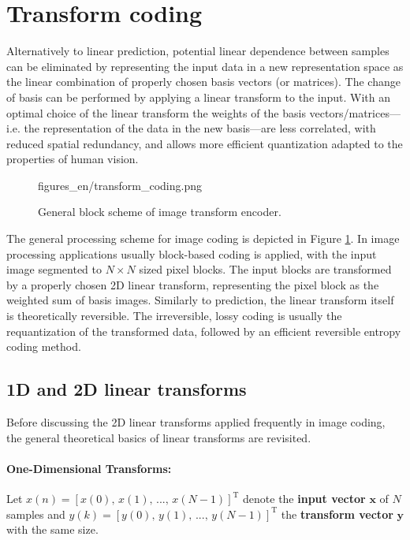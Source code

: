 \section{Transform coding}
Alternatively to linear prediction, potential linear dependence between samples can be eliminated by representing the input data in a new representation space as the linear combination of properly chosen basis vectors (or matrices).
The change of basis can be performed by applying a linear transform to the input.
With an optimal choice of the linear transform the weights of the basis vectors/matrices---i.e. the representation of the data in the new basis---are less correlated, with reduced spatial redundancy, and allows more efficient quantization adapted to the properties of human vision.

\begin{figure}[h!]
	\centering
	\begin{overpic}[width = 0.8\columnwidth ]{figures_en/transform_coding.png}
	\end{overpic}
	\caption{General block scheme of image transform encoder.}
	\label{Fig:transform_coding}
\end{figure}
The general processing scheme for image coding is depicted in Figure \ref{Fig:transform_coding}.
In image processing applications usually block-based coding is applied, with the input image segmented to $N\times N$ sized pixel blocks.
The input blocks are transformed by a properly chosen 2D linear transform, representing the pixel block as the weighted sum of basis images.
Similarly to prediction, the linear transform itself is theoretically reversible.
The irreversible, lossy coding is usually the requantization of the transformed data, followed by an efficient reversible entropy coding method.

\subsection{1D and 2D linear transforms}

Before discussing the 2D linear transforms applied frequently in image coding, the general theoretical basics of linear transforms are revisited.

\paragraph*{One-Dimensional Transforms:\\}
Let $x(n) = [x(0),\, x(1),\,...,\, x(N-1)]^{\mathrm{T}}$ denote the \textbf{input vector} $\mathbf{x}$ of $N$ samples and $y(k) = [y(0),\, y(1),\,...,\, y(N-1)]^{\mathrm{T}}$ the \textbf{transform vector} $\mathbf{y}$ with the same size.


